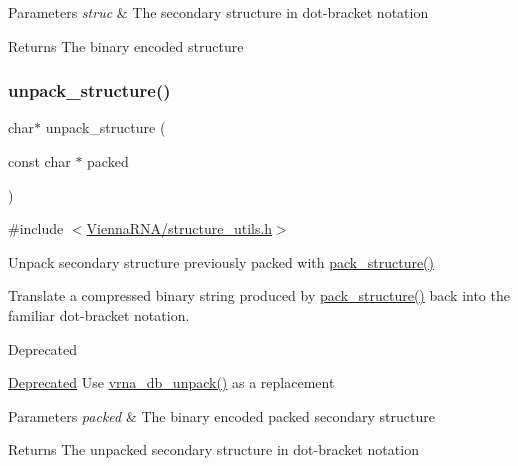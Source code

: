 \begin{DoxyParams}{Parameters}
{\em struc} & The secondary structure in dot-\/bracket notation \\
\hline
\end{DoxyParams}
\begin{DoxyReturn}{Returns}
The binary encoded structure 
\end{DoxyReturn}
\mbox{\label{group__struct__utils_ga071c6921efe1eb974f115ee6fefa3c39}} 
\subsubsection{\texorpdfstring{unpack\+\_\+structure()}{unpack\_structure()}}
{\footnotesize\ttfamily char$\ast$ unpack\+\_\+structure (\begin{DoxyParamCaption}\item[{const char $\ast$}]{packed }\end{DoxyParamCaption})}



{\ttfamily \#include $<$\hyperlink{structure__utils_8h}{Vienna\+R\+N\+A/structure\+\_\+utils.\+h}$>$}



Unpack secondary structure previously packed with \hyperlink{group__struct__utils_gac6dfa5e22928c087c6e09ff0054a7ced}{pack\+\_\+structure()} 

Translate a compressed binary string produced by \hyperlink{group__struct__utils_gac6dfa5e22928c087c6e09ff0054a7ced}{pack\+\_\+structure()} back into the familiar dot-\/bracket notation.

\begin{DoxyRefDesc}{Deprecated}
\item[\hyperlink{deprecated__deprecated000139}{Deprecated}]Use \hyperlink{group__struct__utils_ga6490adff857d84ce06e6f379ae3a4512}{vrna\+\_\+db\+\_\+unpack()} as a replacement \end{DoxyRefDesc}

\begin{DoxyParams}{Parameters}
{\em packed} & The binary encoded packed secondary structure \\
\hline
\end{DoxyParams}
\begin{DoxyReturn}{Returns}
The unpacked secondary structure in dot-\/bracket notation 
\end{DoxyReturn}
\mbox{\label{group__struct__utils_ga89c32307ee50a0026f4a3131fac0845a}} 
